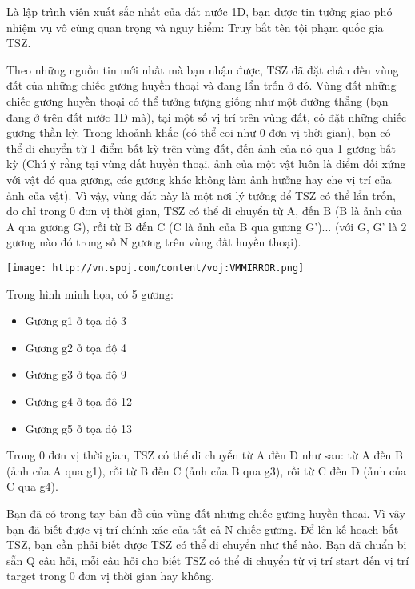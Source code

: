 Là lập trình viên xuất sắc nhất của đất nước 1D, bạn được tin tưởng giao phó nhiệm vụ vô cùng quan trọng và nguy hiểm: Truy bắt tên tội phạm quốc gia TSZ.

Theo những nguồn tin mới nhất mà bạn nhận được, TSZ đã đặt chân đến vùng đất của những chiếc gương huyền thoại và đang lẩn trốn ở đó. Vùng đất những chiếc gương huyền thoại có thể tưởng tượng giống như một đường thẳng (bạn đang ở trên đất nước 1D mà), tại một số vị trí trên vùng đất, có đặt những chiếc gương thần kỳ. Trong khoảnh khắc (có thể coi như 0 đơn vị thời gian), bạn có thể di chuyển từ 1 điểm bất kỳ trên vùng đất, đến ảnh của nó qua 1 gương bất kỳ (Chú ý rằng tại vùng đất huyền thoại, ảnh của một vật luôn là điểm đối xứng với vật đó qua gương, các gương khác không làm ảnh hưởng hay che vị trí của ảnh của vật). Vì vậy, vùng đất này là một nơi lý tưởng để TSZ có thể lẩn trốn, do chỉ trong 0 đơn vị thời gian, TSZ có thể di chuyển từ A, đến B (B là ảnh của A qua gương G), rồi từ B đến C (C là ảnh của B qua gương G')... (với G, G' là 2 gương nào đó trong số N gương trên vùng đất huyền thoại).


\texttt{[image: http://vn.spoj.com/content/voj:VMMIRROR.png]}

Trong hình minh họa, có 5 gương:
\begin{itemize}
	\item Gương g1 ở tọa độ 3
	\item Gương g2 ở tọa độ 4
	\item Gương g3 ở tọa độ 9
	\item Gương g4 ở tọa độ 12
	\item Gương g5 ở tọa độ 13
\end{itemize}

Trong 0 đơn vị thời gian, TSZ có thể di chuyển từ A đến D như sau: từ A đến B (ảnh của A qua g1), rồi từ B đến C (ảnh của B qua g3), rồi từ C đến D (ảnh của C qua g4).

Bạn đã có trong tay bản đồ của vùng đất những chiếc gương huyền thoại. Vì vậy bạn đã biết được vị trí chính xác của tất cả N chiếc gương. Để lên kế hoạch bắt TSZ, bạn cần phải biết được TSZ có thể di chuyển như thế nào. Bạn đã chuẩn bị sẵn Q câu hỏi, mỗi câu hỏi cho biết TSZ có thể di chuyển từ vị trí start đến vị trí target trong 0 đơn vị thời gian hay không.